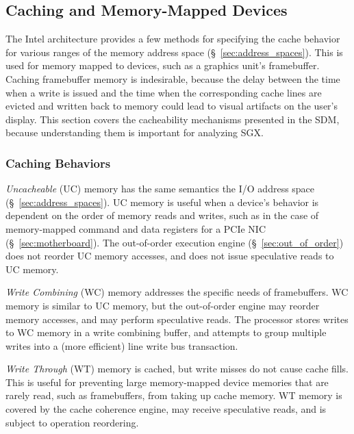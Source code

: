 \subsection{Caching and Memory-Mapped Devices}
\label{sec:memory_io}

The Intel architecture provides a few methods for specifying the cache behavior
for various ranges of the memory address space (\S~\ref{sec:address_spaces}).
This is used for memory mapped to devices, such as a graphics unit's
framebuffer. Caching framebuffer memory is indesirable, because the delay
between the time when a write is issued and the time when the corresponding
cache lines are evicted and written back to memory could lead to visual
artifacts on the user's display. This section covers the cacheability
mechanisms presented in the SDM, because understanding them is important for
analyzing SGX.


\subsubsection{Caching Behaviors}
\label{sec:cacheability_options}


\textit{Uncacheable} (UC) memory has the same semantics the I/O address space
(\S~\ref{sec:address_spaces}). UC memory is useful when a device's behavior is
dependent on the order of memory reads and writes, such as in the case of
memory-mapped command and data registers for a PCIe NIC
(\S~\ref{sec:motherboard}). The out-of-order execution engine
(\S~\ref{sec:out_of_order}) does not reorder UC memory accesses, and does not
issue speculative reads to UC memory.

\textit{Write Combining} (WC) memory addresses the specific needs of
framebuffers. WC memory is similar to UC memory, but the out-of-order engine
may reorder memory accesses, and may perform speculative reads. The processor
stores writes to WC memory in a write combining buffer, and attempts to group
multiple writes into a (more efficient) line write bus transaction.

\textit{Write Through} (WT) memory is cached, but write misses do not cause
cache fills. This is useful for preventing large memory-mapped device memories
that are rarely read, such as framebuffers, from taking up cache memory. WT
memory is covered by the cache coherence engine, may receive speculative reads,
and is subject to operation reordering.

